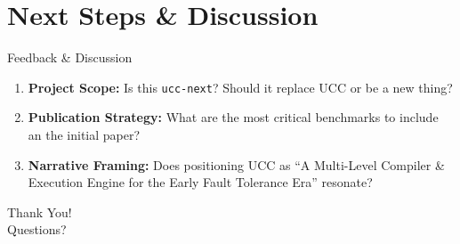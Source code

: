 \documentclass[11pt, aspectratio=169]{beamer}
\begin{document}
\section{Next Steps \& Discussion}

\begin{frame}{Feedback \& Discussion}
  \begin{enumerate}
      \item \textbf{Project Scope:} Is this \texttt{ucc-next}? Should it replace UCC or be a new thing?
      \vspace{1em}
      \item \textbf{Publication Strategy:} What are the most critical benchmarks to include an the initial paper?
      \vspace{1em}
      \item \textbf{Narrative Framing:} Does positioning UCC as ``A Multi-Level Compiler \& Execution Engine for the Early Fault Tolerance Era'' resonate?
  \end{enumerate}
\end{frame}

\begin{frame}[standout]
  Thank You! \\
  \vspace{0.5cm}
  \normalsize Questions?
\end{frame}
\end{document}
